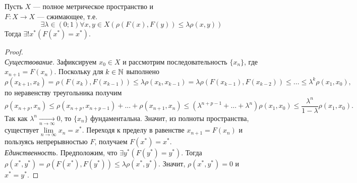 \begin{theorem}\label{banach-compact}
    Пусть $X$ --- полное метрическое пространство и\\\(F: X \rightarrow X\) --- сжимающее, т.е.
    \[\exists \lambda \in (0; 1)\forall x, y \in X \left(\rho(F(x), F(y)) \leqslant \lambda \rho(x, y) \right)\]
    Тогда \(\exists! x^* \left(F(x^*) = x^* \right)\).
\end{theorem}
\begin{proof} \\
    \textit{Существование.} Зафиксируем \(x_0 \in X\) и рассмотрим последовательность \(\{x_n\}\), где \(x_{n+1} = F(x_n)\). Поскольку для \(k \in \mathbb{N}\) выполнено
    \[\rho(x_{k+1}, x_k) = \rho \left(F(x_k), F(x_{k-1}) \right) \leqslant \lambda \rho(x_k, x_{k-1}) = \lambda \rho \left(F(x_{k-1}), F(x_{k-2}) \right) \leqslant ... \leqslant \lambda^k \rho \left(x_1, x_0 \right),\]
    по неравенству треугольника получим
    \[\rho(x_{n+p}, x_{n}) \leqslant \rho(x_{n+p}, x_{n+p-1}) + ... + \rho(x_{n+1}, x_n) \leqslant \left(\lambda^{n+p-1} + ... + \lambda^n \right) \rho(x_1, x_0) \leqslant \frac{\lambda^n}{1 - \lambda} \rho(x_1, x_0).\]
    Так как \(\lambda^n \xrightarrow[n \rightarrow \infty]{} 0\), то \(\{x_n\}\) фундаментальна. Значит, из полноты пространства, существует\(\lim\limits_{n \rightarrow \infty}x_n = x^*\). Переходя к пределу в равенстве \(x_{n+1} = F(x_n)\) и пользуясь непрерывностью \(F\), получаем \(F(x^*)=x^*\).
    \\

    \noindent\textit{Единственность.} Предположим, что \(\exists y^*\left(F(y^*) = y^* \right)\). Тогда \(\rho(x^*, y^*) = \rho \left(F(x^*), F(y^*) \right) \leqslant \lambda \rho(x^*, y^*)\). Значит, \(\rho(x^*, y^*) = 0\) и \(x^*=y^*\).
\end{proof}